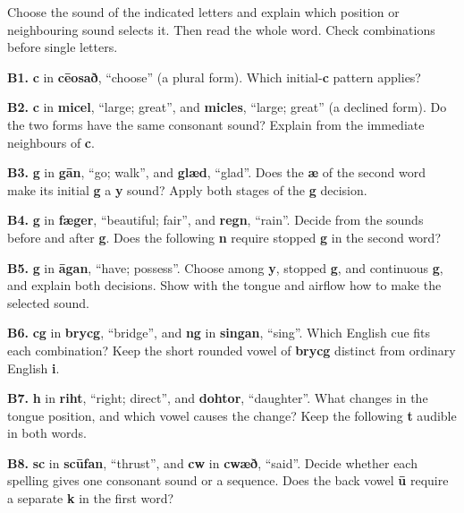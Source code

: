 Choose the sound of the indicated letters and explain which position or neighbouring sound selects it. Then read the whole word. Check combinations before single letters.

\textbf{B1.} \textbf{c} in \textbf{cēosað}, “choose” (a plural form). Which initial-\textbf{c} pattern applies?

\textbf{B2.} \textbf{c} in \textbf{micel}, “large; great”, and \textbf{micles}, “large; great” (a declined form). Do the two forms have the same consonant sound? Explain from the immediate neighbours of \textbf{c}.

\textbf{B3.} \textbf{g} in \textbf{gān}, “go; walk”, and \textbf{glæd}, “glad”. Does the \textbf{æ} of the second word make its initial \textbf{g} a \textbf{y} sound? Apply both stages of the \textbf{g} decision.

\textbf{B4.} \textbf{g} in \textbf{fæger}, “beautiful; fair”, and \textbf{regn}, “rain”. Decide from the sounds before and after \textbf{g}. Does the following \textbf{n} require stopped \textbf{g} in the second word?

\textbf{B5.} \textbf{g} in \textbf{āgan}, “have; possess”. Choose among \textbf{y}, stopped \textbf{g}, and continuous \textbf{g}, and explain both decisions. Show with the tongue and airflow how to make the selected sound.

\textbf{B6.} \textbf{cg} in \textbf{brycg}, “bridge”, and \textbf{ng} in \textbf{singan}, “sing”. Which English cue fits each combination? Keep the short rounded vowel of \textbf{brycg} distinct from ordinary English \textbf{i}.

\textbf{B7.} \textbf{h} in \textbf{riht}, “right; direct”, and \textbf{dohtor}, “daughter”. What changes in the tongue position, and which vowel causes the change? Keep the following \textbf{t} audible in both words.

\textbf{B8.} \textbf{sc} in \textbf{scūfan}, “thrust”, and \textbf{cw} in \textbf{cwæð}, “said”. Decide whether each spelling gives one consonant sound or a sequence. Does the back vowel \textbf{ū} require a separate \textbf{k} in the first word?

